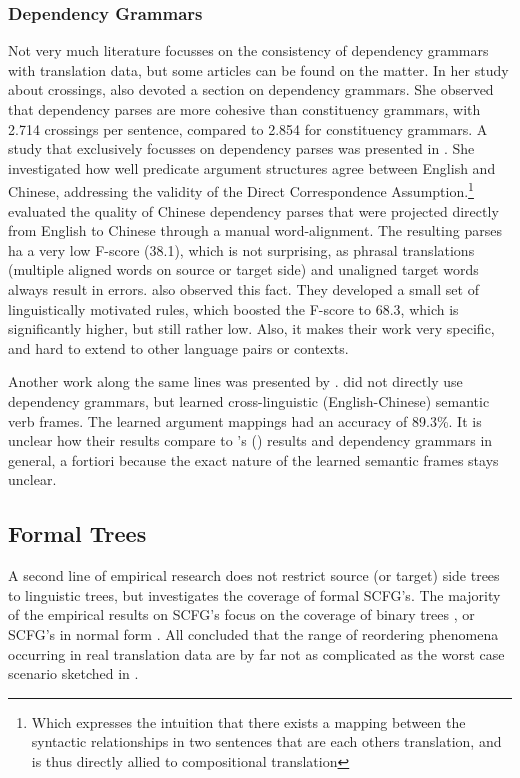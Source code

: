 \documentclass{report}
\theoremstyle{break}
\def\citepos#1{\citeauthor{#1}'s (\citeyear{#1})}
\begin{document}
\subsubsection{Dependency Grammars}

Not very much literature focusses on the consistency of dependency grammars with translation data, but some articles can be found on the matter. In her study about crossings, \citeauthor{fox2002phrasal} also devoted a section on dependency grammars. She observed that dependency parses are more cohesive than constituency grammars, with
2.714 crossings per sentence, compared to 2.854 for constituency grammars. A study that exclusively focusses on dependency parses was presented in \cite{hwa2002evaluating}. She investigated how well predicate argument structures agree between English and Chinese, addressing the validity of the Direct Correspondence Assumption.\footnote{Which expresses the intuition that there exists a mapping between the syntactic relationships in two sentences that are each others translation, and is thus directly allied to compositional translation} \citeauthor{hwa2002evaluating} evaluated the quality of Chinese dependency parses that were projected directly from English to Chinese through a manual word-alignment. The resulting parses ha a very low F-score (38.1), which is not surprising, as phrasal translations (multiple aligned words on source or target side) and unaligned target words always result in errors. \citeauthor{hwa2002evaluating} also observed this fact. They developed a small set of linguistically motivated rules, which boosted the F-score to 68.3, which is significantly higher, but still rather low. Also, it makes their work very specific, and hard to extend to other language pairs or contexts.

Another work along the same lines was presented by \cite{fung2006automatic}. \citeauthor{fung2006automatic} did not directly use dependency grammars, but learned cross-linguistic (English-Chinese) semantic verb frames. The learned argument mappings  had an accuracy of 89.3\%. It is unclear how their results compare to \citepos{hwa2002evaluating} results and dependency grammars in general, a fortiori because the exact nature of the learned semantic frames stays unclear.

\subsection{Formal Trees}

A second line of empirical research does not restrict source (or target) side trees to linguistic trees, but investigates the coverage of formal SCFG's. The majority of the empirical results on SCFG's focus on the coverage of binary trees \citep[e.g.,]{zhang2006synchronous,huang2009binarization}, or SCFG's in normal form \citep[e.g.,][]{sogaard2009empirical1,sogaard2009empirical2,sogaard2010can}. All concluded that the range of reordering phenomena occurring in real translation data are by far not as complicated as the worst case scenario sketched in \cite{satta2005some}.
\end{document}
